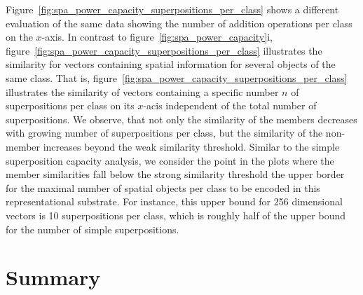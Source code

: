 Figure~\ref{fig:spa_power_capacity_superpositions_per_class} shows a different evaluation of the same data showing the number of addition operations per class on the $x$-axis.
In contrast to figure~\ref{fig:spa_power_capacity}i, figure~\ref{fig:spa_power_capacity_superpositions_per_class} illustrates the similarity for vectors containing spatial information for several objects of the same class.
That is, figure~\ref{fig:spa_power_capacity_superpositions_per_class} illustrates the similarity of vectors containing a specific number $n$ of superpositions per class on its $x$-acis independent of the total number of superpositions.
We observe, that not only the similarity of the members decreases with growing number of superpositions per class, but the similarity of the non-member increases beyond the weak similarity threshold.
Similar to the simple superposition capacity analysis, we consider the point in the plots where the member similarities fall below the strong similarity threshold the upper border for the maximal number of spatial objects per class to be encoded in this representational substrate.
For instance, this upper bound for \num{256} dimensional vectors is \num{10} superpositions per class, which is roughly half of the upper bound for the number of simple superpositions.

\section{Summary}%
\label{sec:vector_representations_automotive_summary}

